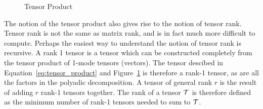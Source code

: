 \documentclass[../ut-dissertation.tex]{subfiles}
\begin{document}
\begin{figure}%
  \centering
  \qquad
  \qquad
  \caption{Tensor Product} \label{fig:tensor_product}
\end{figure}

The notion of the tensor product also gives rise to the notion of
tensor rank.  Tensor rank is not the same as matrix rank, and is in
fact much more difficult to compute.  Perhaps the easiest way to
understand the notion of tensor rank is recursive.  A rank 1 tensor is
a tensor which can be constructed completely from the tensor product
of 1-mode tensors (vectors).  The tensor descibed in
Equation~\ref{eq:tensor_product} and
Figure~\ref{fig:tensor_product} is therefore a rank-1 tensor, as are
all the factors in the polyadic decomposition.  A tensor of general
rank $r$ is the result of adding $r$ rank-1 tensors together. The rank
of a tensor $\mathcal{T}$ is therefore defined as the minimum number of
rank-1 tensors needed to sum to $\mathcal{T}$.
\end{document}
